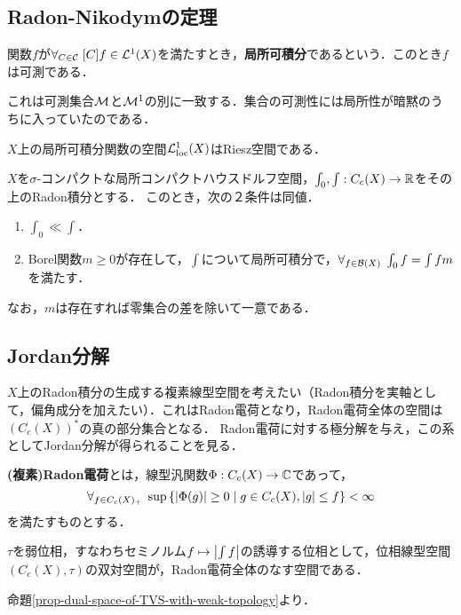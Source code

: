 \documentclass[uplatex,dvipdfmx]{jsreport}
\begin{document}
\subsection{Radon-Nikodymの定理}

\begin{definition}\label{def-locally-integrable-function}
    関数$f$が$\forall_{C\in\mathcal{C}}\;[C]f\in\mathcal{L}^1(X)$を満たすとき，\textbf{局所可積分}であるという．このとき$f$は可測である．
\end{definition}
\begin{remarks}
    これは可測集合$\mathcal{M}$と$\mathcal{M}^1$の別に一致する．集合の可測性には局所性が暗黙のうちに入っていたのである．
\end{remarks}

\begin{lemma}
    $X$上の局所可積分関数の空間$\mathcal{L}^1_{\mathrm{loc}}(X)$はRiesz空間である．
\end{lemma}

\begin{theorem}
    $X$を$\sigma$-コンパクトな局所コンパクトハウスドルフ空間，$\int_0,\int:C_c(X)\to\mathbb{R}$をその上のRadon積分とする．
    このとき，次の２条件は同値．
    \begin{enumerate}
        \item $\int_0\ll\int$．
        \item Borel関数$m\ge0$が存在して，$\int$について局所可積分で，$\forall_{f\in\mathcal{B}(X)}\;\int_0f=\int fm$を満たす．
    \end{enumerate}
    なお，$m$は存在すれば零集合の差を除いて一意である．
\end{theorem}

\subsection{Jordan分解}

\begin{tcolorbox}[colframe=ForestGreen, colback=ForestGreen!10!white,breakable,colbacktitle=ForestGreen!40!white,coltitle=black,fonttitle=\bfseries\sffamily,
title=]
    $X$上のRadon積分の生成する複素線型空間を考えたい（Radon積分を実軸として，偏角成分を加えたい）．これはRadon電荷となり，Radon電荷全体の空間は$(C_c(X))^*$の真の部分集合となる．
    Radon電荷に対する極分解を与え，この系としてJordan分解が得られることを見る．
\end{tcolorbox}

\begin{definition}
    \textbf{(複素)Radon電荷}とは，線型汎関数$\Phi:C_c(X)\to\mathbb{C}$であって，
    \[\forall_{f\in C_c(X)_+}\;\sup\left\{\lvert\Phi(g)\rvert\ge0\mid g\in C_c(X),\lvert g\rvert\le f\right\}<\infty\]
    を満たすものとする．
\end{definition}
\begin{lemma}[Radon電荷の抽象的特徴付け]
    $\tau$を弱位相，すなわちセミノルム$f\mapsto\left|\int f\right|$の誘導する位相として，位相線型空間$(C_c(X),\tau)$の双対空間が，Radon電荷全体のなす空間である．
\end{lemma}
\begin{Proof}
    命題\ref{prop-dual-space-of-TVS-with-weak-topology}より．
\end{Proof}
\end{document}
